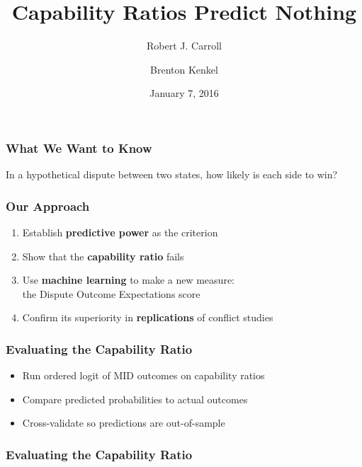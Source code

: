 \documentclass{beamer}
\title{Capability Ratios Predict Nothing}
\date{January 7, 2016}
\author{Robert J. Carroll \and Brenton Kenkel}
\begin{document}
\maketitle

\begin{frame}
  \frametitle{What We Want to Know}

  In a hypothetical dispute between two states, how likely is each side to win?
\end{frame}

\begin{frame}
  \frametitle{Our Approach}

  \begin{enumerate}
    \item Establish \textbf{predictive power} as the criterion
    \item Show that the \textbf{capability ratio} fails
    \item Use \textbf{machine learning} to make a new measure:\\
    the Dispute Outcome Expectations score
    \item Confirm its superiority in \textbf{replications} of conflict studies
  \end{enumerate}
\end{frame}

\begin{frame}
  \frametitle{Evaluating the Capability Ratio}

  \begin{itemize}
    \item Run ordered logit of MID outcomes on capability ratios
    \item Compare predicted probabilities to actual outcomes
    \item Cross-validate so predictions are out-of-sample
  \end{itemize}
\end{frame}

\begin{frame}
  \frametitle{Evaluating the Capability Ratio}

  
\end{frame}
\end{document}
